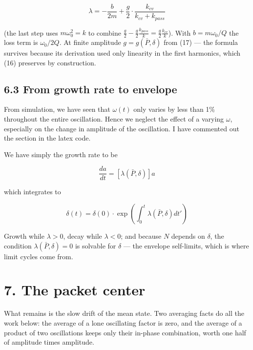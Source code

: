 \documentclass[11pt]{article}
\begin{document}
\begin{equation}
\lambda = -\frac{b}{2m} + \frac{g}{2}\cdot\frac{k_{cv}}{k_{cv}+k_{pass}} \tag{20}
\end{equation}

(the last step uses $m\omega_0^2 = k$ to combine $\frac g2 - \frac g2\frac{k_{pass}}{k} = \frac g2\frac{k_{cv}}{k}$). With $b = m\omega_0/Q$ the loss term is $\omega_0/2Q$. At finite amplitude $g = g(\bar P, \delta)$ from (17) --- the formula survives because its derivation used only linearity in the first harmonics, which (16) preserves by construction.

\subsection*{6.3 From growth rate to envelope}

From simulation, we have seen that $\omega(t)$ only varies by less than 1\% throughout the entire oscillation. Hence we neglect the effect of a varying $\omega$, especially on the change in amplitude of the oscillation. I have commented out the section in the latex code.

We have simply the growth rate to be

\begin{equation}
\frac{da}{dt} = \left[\lambda(\bar P, \delta)\right]a \tag{21}
\end{equation}

which integrates to

\begin{equation}
\delta(t) = \delta(0)\cdot\exp\left(\int_0^t\lambda(\bar P,\delta)dt'\right) \tag{22}
\end{equation}

Growth while $\lambda > 0$, decay while $\lambda < 0$; and because $N$ depends on $\delta$, the condition $\lambda(\bar P, \delta) = 0$ is solvable for $\delta$ --- the envelope self-limits, which is where limit cycles come from.

\section*{7. The packet center}

What remains is the slow drift of the mean state. Two averaging facts do all the work below: the average of a lone oscillating factor is zero, and the average of a product of two oscillations keeps only their in-phase combination, worth one half of amplitude times amplitude.
\end{document}
